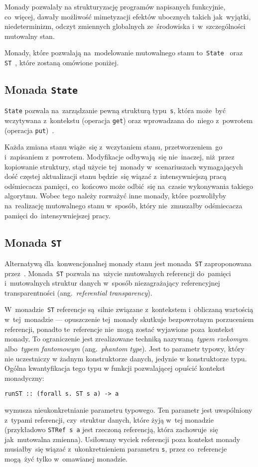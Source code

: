 \documentclass[../../praca.tex]{subfiles}
\begin{document}
Monady pozwalały na strukturyzację programów napisanych funkcyjnie, co~więcej,
dawały możliwość mimetyzacji efektów ubocznych takich jak~wyjątki,
niedeterminizm, odczyt zmiennych globalnych ze~środowiska i~w~szczególności
mutowalny stan.

Monady, które pozwalają na~modelowanie mutowalnego stanu to~\texttt{State}~\cite{OSullivan:RWH}
oraz \texttt{ST}~\cite{Launchbury:LFST}, które zostaną omówione poniżej.

\subsection{Monada \texttt{State}}

\texttt{State} pozwala na~zarządzanie pewną strukturą typu~\texttt{s}, która
może~być wczytywana z~kontekstu (operacja \texttt{get}) oraz wprowadzana do~niego z~powrotem
(operacja \texttt{put})~\cite{OSullivan:RWH}.

Każda zmiana stanu wiąże~się z~wczytaniem stanu, przetworzeniem~go i~zapisaniem z~powrotem.
Modyfikacje odbywają~się nie~inaczej, niż~przez kopiowanie struktury, stąd użycie tej~monady
w~scenariuszach wymagających dość częstej aktualizacji stanu będzie~się wiązać z~intensywniejszą
pracą odśmiecacza pamięci, co~końcowo może odbić~się na~czasie wykonywania takiego algorytmu.
Wobec tego należy rozważyć inne monady, które pozwoliłyby na~realizację mutowalnego stanu
w~sposób, który nie~zmuszałby odśmiecacza pamięci do~intensywniejszej pracy.

\subsection{Monada \texttt{ST}}

Alternatywą dla~konwencjonalnej monady stanu jest monada~\texttt{ST} zaproponowana
przez~\cite{Launchbury:LFST}. Monada~\texttt{ST} pozwala na~użycie mutowalnych
referencji do~pamięci i~mutowalnych struktur danych w~sposób niezagrażający
referencyjnej transparentności (ang.~\emph{referential transparency}).

W~monadzie~\texttt{ST} referencje są~silnie związane z~kontekstem i~obliczaną wartością
w~tej~monadzie --- opuszczenie tej~monady skutkuje bezpowrotnym porzuceniem referencji,
ponadto te~referencje nie~mogą zostać wyjawione poza~kontekst monady. To ograniczenie
jest zrealizowane techniką nazywaną~\emph{typem rzekomym} albo~\emph{typem fantomowym}
(ang.~\emph{phantom type}). Jest to parametr typowy, który nie uczestniczy w żadnym 
konstruktorze danych, jedynie w konstruktorze typu. Ogólna kwantyfikacja tego typu
w funkcji pozwalającej opuścić kontekst monadyczny:
\begin{verbatim}
runST :: (forall s. ST s a) -> a
\end{verbatim}
wymusza nieukonkretnianie parametru typowego. Ten parametr jest uwspólniony z~typami
referencji, czy~struktur danych, które żyją w~tej monadzie (przykładowo \texttt{STRef s a}
jest rzeczoną referencją, która zachowuje~się jak~mutowalna zmienna).
Usiłowany wyciek referencji poza kontekst monady musiałby~się wiązać z~ukonkretnieniem parametru
\texttt{s}, przez co~referencje mogą~żyć tylko w~omawianej monadzie.
\end{document}
